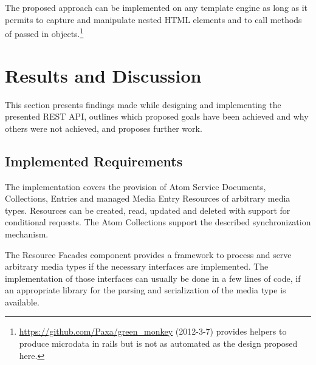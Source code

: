 \documentclass[11pt,a4paper,headsepline,twoside]{scrartcl}		%
\newcommand{\citeurl}[2]{\url{#1} (#2)}
\begin{document}
The proposed approach can be implemented on any template engine as long as it
permits to capture and manipulate nested HTML elements and to call methods of
passed in
objects.\footnote{\citeurl{https://github.com/Paxa/green_monkey}{2012-3-7}
  provides helpers to produce microdata in rails but is not as automated as the
  design proposed here.}






\section{Results and Discussion}
\label{sec:results-discussion}

This section presents findings made while designing and implementing the
presented REST API, outlines which proposed goals have been achieved and why
others were not achieved, and proposes further work.

\subsection{Implemented Requirements}
\label{sec:impl-requ}

The implementation covers the provision of Atom Service Documents, Collections,
Entries and managed Media Entry Resources of arbitrary media types. Resources can
be created, read, updated and deleted with support for conditional requests. The
Atom Collections support the described synchronization mechanism.

The Resource Facades component provides a framework to process and serve
arbitrary media types if the necessary interfaces are implemented. The
implementation of those interfaces can usually be done in a few lines of code,
if an appropriate library for the parsing and serialization of the media type is
available.
\end{document}

